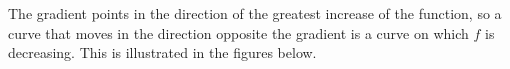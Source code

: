 \begin{exercises}
\begin{exerciseSolution}
\begin{center}
 \hspace{0.1in}   \hspace{0.1in} 
\end{center}


\item The gradient points in the direction of the greatest increase of the function, so a curve that moves in the direction opposite the gradient is a curve on which $f$ is decreasing. This is illustrated in the figures below.

\begin{center}
 \hspace{0.1in}   \hspace{0.1in} 
\end{center}
  \ea
\end{exerciseSolution}

\end{exercises}

\afterexercises
